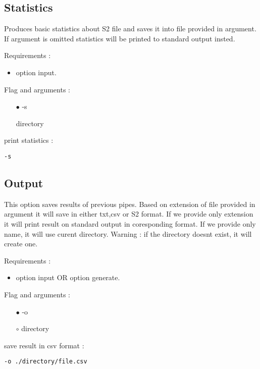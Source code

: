 \documentclass[english]{article}
\begin{document}
\subsection{Statistics}
Produces basic statistics about S2 file and saves it into file provided in argument. If argument is omitted statistics will be printed to standard output insted.

\noindent Requirements : 
\begin{itemize}
\item option input. 
\end{itemize}
Flag and arguments :
\begin{itemize}
\item[$\bullet$] -s
\item[\textasteriskcentered] directory
\end{itemize}
print statistics : 
\begin{lstlisting} 
-s
\end{lstlisting}


\subsection{Output}
This option saves results of previous pipes. Based on extension of file provided in argument it will save in either txt,csv or S2 format. If we provide only extension it will print result on standard output in coresponding format. If we provide only name, it will use curent directory. Warning : if the directory doesnt exist, it will create one.

\noindent Requirements : 
\begin{itemize}
\item option input OR option generate. 
\end{itemize}
Flag and arguments :
\begin{itemize}
\item[$\bullet$] -o
\item[$\circ$] directory
\end{itemize}
save result in csv format : 
\begin{lstlisting} 
-o ./directory/file.csv
\end{lstlisting}
\end{document}
